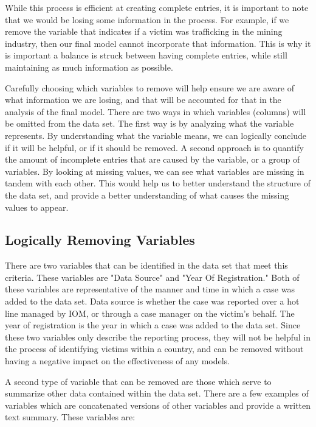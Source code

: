 \documentclass{article} %
\begin{document}
	While this process is efficient at creating complete entries, it is important to note that we would be losing some information in the process. For example, if we remove the variable that indicates if a victim was trafficking in the mining industry, then our final model cannot incorporate that information. This is why it is important a balance is struck between having complete entries, while still maintaining as much information as possible.
	
	Carefully choosing which variables to remove will help ensure we are aware of what information we are losing, and that will be accounted for that in the analysis of the final model. There are two ways in which variables (columns) will be omitted from the data set. The first way is by analyzing what the variable represents. By understanding what the variable means, we can logically conclude if it will be helpful, or if it should be removed. A second approach is to quantify the amount of incomplete entries that are caused by the variable, or a group of variables. By looking at missing values, we can see what variables are missing in tandem with each other. This would help us to better understand the structure of the data set, and provide a better understanding of what causes the missing values to appear.
	
	
	
	\subsection{Logically Removing Variables}
	 
	
	There are two variables that can be identified in the data set that meet this criteria. These variables are "Data Source" and "Year Of Registration." Both of these variables are representative of the manner and time in which a case was added to the data set. Data source is whether the case was reported over a hot line managed by IOM, or through a case manager on the victim's behalf. The year of registration is the year in which a case was added to the data set. Since these two variables only describe the reporting process, they will not be helpful in the process of identifying victims within a country, and can be removed without having a negative impact on the effectiveness of any models.
	
	A second type of variable that can be removed are those which serve to summarize other data contained within the data set. There are a few examples of variables which are concatenated versions of other variables and provide a written text summary. These variables are:
	
\end{document}
